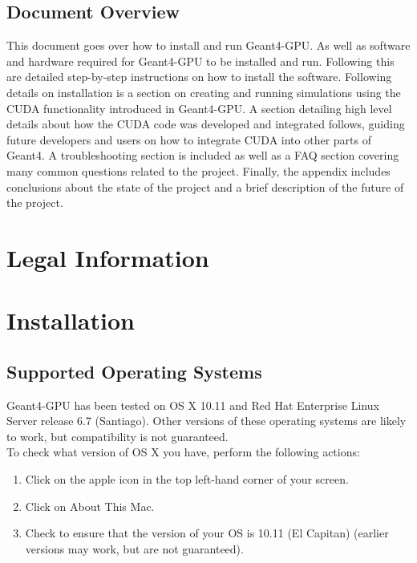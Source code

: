 \documentclass[12pt]{article}
\begin{document}
\subsection{Document Overview} %
This document goes over how to install and run Geant4-GPU. As well as software and hardware required for Geant4-GPU to be installed and run. Following this are detailed step-by-step instructions on how to install the software. Following details on installation is a section on creating and running simulations using the CUDA functionality introduced in Geant4-GPU. A section detailing high level details about how the CUDA code was developed and integrated follows, guiding future developers and users on how to integrate CUDA into other parts of Geant4. A troubleshooting section is included as well as a FAQ section covering many common questions related to the project. Finally, the appendix includes conclusions about the state of the project and a brief description of the future of the project.

\section{Legal Information}	%

\section{Installation} %

\subsection{Supported Operating Systems} %
Geant4-GPU has been tested on OS X 10.11 and Red Hat Enterprise Linux Server release 6.7 (Santiago). Other versions of these operating systems are likely to work, but compatibility is not guaranteed.\\

To check what version of OS X you have, perform the following actions:

\begin{enumerate}
\item Click on the apple icon in the top left-hand corner of your screen.
\item Click on About This Mac.
\item Check to ensure that the version of your OS is 10.11 (El Capitan) (earlier versions may work, but are not guaranteed).
\end{enumerate}
\end{document}
